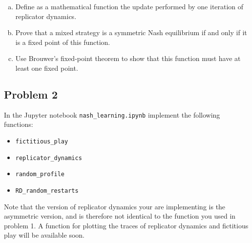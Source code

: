 \documentclass[11pt]{article}
\begin{document}
\begin{enumerate}[(a)]

\item
Define as a mathematical function the update performed by one iteration of replicator dynamics.


\item
Prove that a mixed strategy is a symmetric Nash equilibrium if and only if it is a fixed point of this function.


\item
Use Brouwer's fixed-point theorem to show that this function must have at least one fixed point.


\end{enumerate}






\subsection*{Problem 2}

In the Jupyter notebook \texttt{nash\_learning.ipynb} implement the following functions:

\begin{itemize}
\item \texttt{fictitious\_play}
\item \texttt{replicator\_dynamics}
\item \texttt{random\_profile}
\item \texttt{RD\_random\_restarts}
\end{itemize}

Note that the version of replicator dynamics your are implementing is the asymmetric version, and is therefore not identical to the function you used in problem 1.
A function for plotting the traces of replicator dynamics and fictitious play will be available soon.
\end{document}
